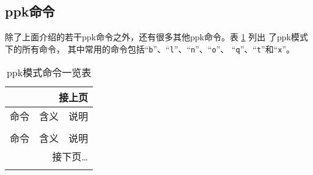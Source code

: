 \subsection{ppk命令}
除了上面介绍的若干ppk命令之外，还有很多其他ppk命令。表 \ref{table:plotpk-commands} 列出
了ppk模式下的所有命令，
其中常用的命令包括``\texttt{b}''、``\texttt{l}''、``\texttt{n}''、``\texttt{o}''、
``\texttt{q}''、``\texttt{t}''和``\texttt{x}''。

\begin{center}
\small\ttfamily
\begin{longtable}{cll}
\multicolumn{3}{r}{接上页} \\
\toprule
命令    &   含义    &   说明    \\
\midrule
\endhead
\caption{ppk模式命令一览表} \label{table:plotpk-commands}   \\
\toprule
命令    &   含义    &   说明    \\
\midrule
\endfirsthead
\bottomrule
\multicolumn{3}{r}{接下页\dots} \\
\endfoot
\bottomrule
\endlastfoot


\end{longtable}
\end{center}
